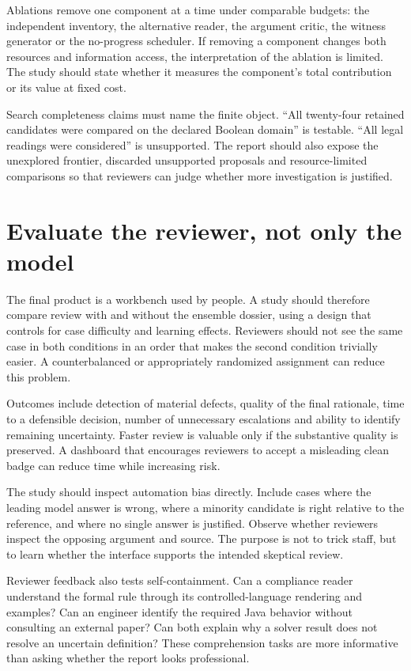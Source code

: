 Ablations remove one component at a time under comparable budgets: the independent
inventory, the alternative reader, the argument critic, the witness generator or
the no-progress scheduler. If removing a component changes both resources and
information access, the interpretation of the ablation is limited. The study
should state whether it measures the component's total contribution or its value
at fixed cost.

Search completeness claims must name the finite object. ``All twenty-four retained
candidates were compared on the declared Boolean domain'' is testable. ``All legal
readings were considered'' is unsupported. The report should also expose the
unexplored frontier, discarded unsupported proposals and resource-limited
comparisons so that reviewers can judge whether more investigation is justified.

\section{Evaluate the reviewer, not only the model}
\label{merge:M09:11}


The final product is a workbench used by people. A study should therefore compare
review with and without the ensemble dossier, using a design that controls for
case difficulty and learning effects. Reviewers should not see the same case in
both conditions in an order that makes the second condition trivially easier.
A counterbalanced or appropriately randomized assignment can reduce this problem.

Outcomes include detection of material defects, quality of the final rationale,
time to a defensible decision, number of unnecessary escalations and ability to
identify remaining uncertainty. Faster review is valuable only if the substantive
quality is preserved. A dashboard that encourages reviewers to accept a misleading
clean badge can reduce time while increasing risk.

The study should inspect automation bias directly. Include cases where the
leading model answer is wrong, where a minority candidate is right relative to
the reference, and where no single answer is justified. Observe whether reviewers
inspect the opposing argument and source. The purpose is not to trick staff, but
to learn whether the interface supports the intended skeptical review.

Reviewer feedback also tests self-containment. Can a compliance reader understand
the formal rule through its controlled-language rendering and examples? Can an
engineer identify the required Java behavior without consulting an external paper?
Can both explain why a solver result does not resolve an uncertain definition?
These comprehension tasks are more informative than asking whether the report
looks professional.

